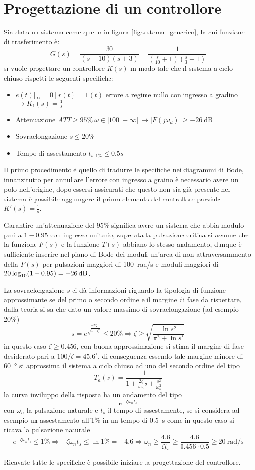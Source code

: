 \section{Progettazione di un controllore}

Sia dato un sistema come quello in figura \ref{fig:sistema_generico}, la
cui funzione di trasferimento è:
$$
    G(s) = \frac{30}{(s+10)(s+3)} = \frac{1}{\left(\frac{s}{10}+1\right)\left(\frac{s}{3}+1\right)}
$$
si vuole
progettare un controllore $K(s)$ in modo tale che il sistema a ciclo chiuso
rispetti le seguenti specifiche:
\begin{itemize}
    \item $e(t)|_{\infty} = 0 \ |\ r(t) = 1(t) $ errore a regime nullo con ingresso a gradino $\rightarrow K_1(s) = \frac{1}{s}$
    \item Attenuazione $ATT \geq 95\%\ \omega \in [100\ +\infty[\ \rightarrow |F(j\omega_d)| \geq \SI{-26}{\deci\bel}$
    \item Sovraelongazione $s\leq 20\%$
    \item Tempo di assestamento $t_{s,1\%} \leq 0.5 s$
\end{itemize}

Il primo procedimento è quello di tradurre le specifiche nei diagrammi di Bode,
innanzitutto per annullare l'errore con ingresso a graino è necessario avere
un polo nell'origine, dopo essersi assicurati che questo non sia già presente nel sistema è possibile aggiungere il primo elemento del controllore parziale $K'(s) = \frac{1}{s}$.

Garantire un'attenuazione del 95\% significa avere un sistema che abbia modulo pari a $1-0.95$ con ingresso unitario, superata la pulsazione critica si assume che la funzione $F(s)$ e la funzione $T(s)$ abbiano lo stesso andamento, dunque
è sufficiente inserire nel piano di Bode dei moduli un'area di non attraversammento della $F(s)$ per pulsazioni maggiori di \SI{100}{\radian/\second} e moduli maggiori di $20\log_{10}(1-0.95) = \SI{-26}{\deci{\bel}}$.

La sovraelongazione $s$ ci dà informazioni riguardo la tipologia di funzione approssimante se del primo o secondo ordine e il margine di fase da rispettare,
dalla teoria si sa che dato un valore massimo di sovraelongazione (ad esempio 20\%)
$$
    s = e^{\frac{-\pi \zeta}{\sqrt{1-\zeta^2}}} \leq 20\% \Rightarrow \zeta \geq \sqrt{\frac{\ln s^2}{\pi^2 + \ln s^2}}
$$
in questo caso $\zeta \geq 0.456$, con buona approssimazione si stima il margine
di fase desiderato pari a $100/\zeta = 45.6^\circ$, di conseguenza essendo tale margine minore di \SI{60}{\degree} si approssima il sistema a ciclo chiuso ad uno del secondo ordine del tipo
$$
    T_a(s) =  \frac{1}{1+\frac{2\zeta}{\omega_n}s + \frac{s^2}{\omega_n^2}}
$$
la curva inviluppo della risposta ha un andamento del tipo
$$
    e^{-\zeta \omega_n t_s}
$$
con $\omega_n$ la pulsazione naturale e $t_s$ il tempo di assestamento, se si considera ad esempio un assestamento all'1\% in un tempo di \SI{0.5}{\second} come in questo caso si ricava la pulsazione naturale
$$
    e^{-\zeta \omega_n t_s} \leq 1\% \Rightarrow -\zeta\omega_n t_s \leq \ln{1\%} = -4.6 \Rightarrow \omega_n \geq \frac{4.6}{\zeta t_s} \geq \frac{4.6}{0.456\cdot 0.5} \geq \SI{20}{\radian/\second}
$$

Ricavate tutte le specifiche è possibile iniziare la progettazione del controllore.



